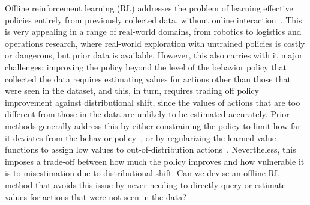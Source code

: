 Offline reinforcement learning (RL) addresses the problem of learning effective policies entirely from previously collected data, without online interaction~\citep{fujimoto2019off, lange2012batch}. This is very appealing in a range of real-world domains, from robotics to logistics and operations research, where real-world exploration with untrained policies is costly or dangerous, but prior data is available. However, this also carries with it major challenges: improving the policy beyond the level of the behavior policy that collected the data requires estimating values for actions other than those that were seen in the dataset, and this, in turn, requires trading off policy improvement against distributional shift, since the values of actions that are too different from those in the data are unlikely to be estimated accurately. Prior methods generally address this by either constraining the policy to limit how far it deviates from the behavior policy~\citep{fujimoto2019off, wu2019behavior, fujimoto2021minimalist, kumar2019stabilizing, nair2020awac, wang2020critic}, or by regularizing the learned value functions to assign low values to out-of-distribution actions~\citep{kumar2020conservative, kostrikov2021offline}. Nevertheless, this imposes a trade-off between how much the policy improves and how vulnerable it is to misestimation due to distributional shift. Can we devise an offline RL method that avoids this issue by never needing to directly query or estimate values for actions that were not seen in the data?

